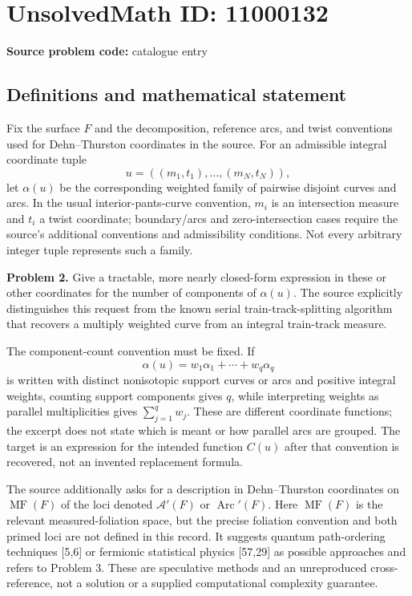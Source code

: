 \documentclass[11pt]{article}
\begin{document}
\section*{UnsolvedMath ID: 11000132}
\textbf{Source problem code:} catalogue entry
\subsection{Definitions and mathematical statement}
Fix the surface $F$ and the decomposition, reference arcs, and twist conventions used for Dehn--Thurston coordinates in the source. For an admissible integral coordinate tuple
\[
 u=((m_1,t_1),\ldots,(m_N,t_N)),
\]
let $\alpha(u)$ be the corresponding weighted family of pairwise disjoint curves and arcs. In the usual interior-pants-curve convention, $m_i$ is an intersection measure and $t_i$ a twist coordinate; boundary/arcs and zero-intersection cases require the source's additional conventions and admissibility conditions. Not every arbitrary integer tuple represents such a family.

\textbf{Problem 2.} Give a tractable, more nearly closed-form expression in these or other coordinates for the number of components of $\alpha(u)$. The source explicitly distinguishes this request from the known serial train-track-splitting algorithm that recovers a multiply weighted curve from an integral train-track measure.

The component-count convention must be fixed. If
\[
 \alpha(u)=w_1\alpha_1+\cdots+w_q\alpha_q
\]
is written with distinct nonisotopic support curves or arcs and positive integral weights, counting support components gives $q$, while interpreting weights as parallel multiplicities gives $\sum_{j=1}^q w_j$. These are different coordinate functions; the excerpt does not state which is meant or how parallel arcs are grouped. The target is an expression for the intended function $C(u)$ after that convention is recovered, not an invented replacement formula.

The source additionally asks for a description in Dehn--Thurston coordinates on $\operatorname{MF}(F)$ of the loci denoted $\mathcal A'(F)$ or $\operatorname{Arc}'(F)$. Here $\operatorname{MF}(F)$ is the relevant measured-foliation space, but the precise foliation convention and both primed loci are not defined in this record. It suggests quantum path-ordering techniques [5,6] or fermionic statistical physics [57,29] as possible approaches and refers to Problem 3. These are speculative methods and an unreproduced cross-reference, not a solution or a supplied computational complexity guarantee.
\end{document}
